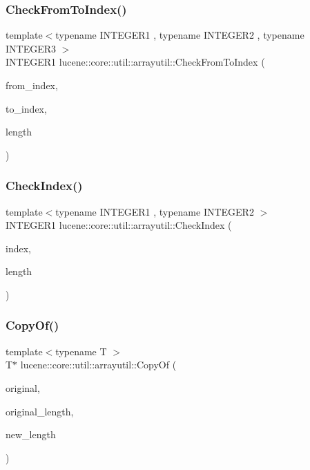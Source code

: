 \subsubsection{\texorpdfstring{Check\+From\+To\+Index()}{CheckFromToIndex()}}
{\footnotesize\ttfamily template$<$typename I\+N\+T\+E\+G\+E\+R1 , typename I\+N\+T\+E\+G\+E\+R2 , typename I\+N\+T\+E\+G\+E\+R3 $>$ \\
I\+N\+T\+E\+G\+E\+R1 lucene\+::core\+::util\+::arrayutil\+::\+Check\+From\+To\+Index (\begin{DoxyParamCaption}\item[{const I\+N\+T\+E\+G\+E\+R1}]{from\+\_\+index,  }\item[{const I\+N\+T\+E\+G\+E\+R2}]{to\+\_\+index,  }\item[{const I\+N\+T\+E\+G\+E\+R3}]{length }\end{DoxyParamCaption})}

\mbox{\label{namespacelucene_1_1core_1_1util_1_1arrayutil_a0cd5572d14e7d2e96ae4a5d055267610}} 
\subsubsection{\texorpdfstring{Check\+Index()}{CheckIndex()}}
{\footnotesize\ttfamily template$<$typename I\+N\+T\+E\+G\+E\+R1 , typename I\+N\+T\+E\+G\+E\+R2 $>$ \\
I\+N\+T\+E\+G\+E\+R1 lucene\+::core\+::util\+::arrayutil\+::\+Check\+Index (\begin{DoxyParamCaption}\item[{const I\+N\+T\+E\+G\+E\+R1}]{index,  }\item[{const I\+N\+T\+E\+G\+E\+R2}]{length }\end{DoxyParamCaption})}

\mbox{\label{namespacelucene_1_1core_1_1util_1_1arrayutil_a42793db2e08af25c01c19eb099ec7d1d}} 
\subsubsection{\texorpdfstring{Copy\+Of()}{CopyOf()}\hspace{0.1cm}{\footnotesize\ttfamily [1/2]}}
{\footnotesize\ttfamily template$<$typename T $>$ \\
T$\ast$ lucene\+::core\+::util\+::arrayutil\+::\+Copy\+Of (\begin{DoxyParamCaption}\item[{const T $\ast$}]{original,  }\item[{const uint32\+\_\+t}]{original\+\_\+length,  }\item[{const uint32\+\_\+t}]{new\+\_\+length }\end{DoxyParamCaption})}

